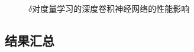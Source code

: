 \begin{figure}[H]
    \caption{$\delta$对度量学习的深度卷积神经网络的性能影响}
    \label{fig:expr:curve:mtrc:delta}
\end{figure}


\subsection{结果汇总\label{sec:expr:allresults}}



